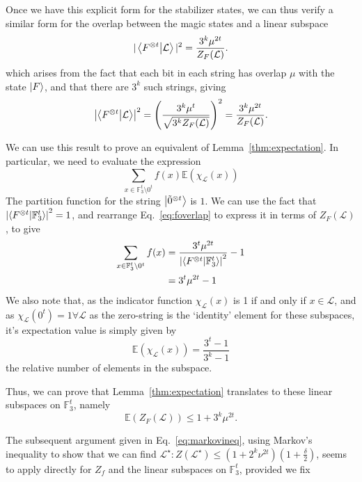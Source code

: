 \documentclass{standalone}
\begin{document}
Once we have this explicit form for the stabilizer states, we can thus verify a similar form for the overlap between the magic states and a linear subspace
\begin{equation}\label{eq:foverlap}
\vert\braket{F^{\otimes t}}{\mathcal{L}}\vert^{2}=\frac{3^{k}\mu^{2t}}{Z_{F}(\mathcal{L})}.
\end{equation}
which arises from the fact that each bit in each string has overlap $\mu$ with the state $\ket{F}$, and that there are $3^{k}$ such strings, giving 
\[\left|\braket{F^{\otimes t}}{\mathcal{L}}\right|^{2}=\left(\frac{3^{k}\mu^{t}}{\sqrt{3^{k}Z_{F}(\mathcal{L})}}\right)^{2}=\frac{3^{k}\mu^{2t}}{Z_{F}(\mathcal{L})}.\]
\par
We can use this result to prove an equivalent of Lemma~\ref{thm:expectation}. In particular, we need to evaluate the expression
\[\sum_{x\in\mathbb{F}_{3}^{t}\setminus 0^{t}}f(x)\mathbb{E}(\chi_{\mathcal{L}}(x))\] 
The partition function for the string $\ket{\tilde{0}^{\otimes t}}$ is $1$. We can use the fact that $\left|\braket{F^{\otimes t}}{\mathbb{F}_{3}^{t}}\right|^{2}=1$, and rearrange Eq.~\ref{eq:foverlap} to express it in terms of $Z_{F}(\mathcal{L})$, to give
\begin{align}
\begin{split}
\sum_{x\in\mathbb{F}_{3}^{t}\setminus 0^{t}}f(x) &= 
\frac{3^{t}\mu^{2t}}{\left|\braket{F^{\otimes t}}{\mathbb{F}_{3}^{t}}\right|^{2}} - 1\\
&= 3^{t}\mu^{2t}-1
\end{split}
\end{align}
We also note that, as the indicator function $\chi_{\mathcal{L}}(x)$ is 1 if and only if $x\in\mathcal{L}$, and as $\chi_{\mathcal{L}}(0^{t})=1\forall\mathcal{L}$ as the zero-string is the `identity' element for these subspaces, it's expectation value is simply given by
\begin{equation}
\mathbb{E}\left(\chi_{\mathcal{L}}(x)\right)=\frac{3^{t}-1}{3^{k}-1}
\end{equation}
the relative number of elements in the subspace. 
\par
Thus, we can prove that Lemma~\ref{thm:expectation} translates to these linear subspaces on $\mathbb{F}_{3}^{t}$, namely
\begin{equation}
\mathbb{E}\left( Z_{F}(\mathcal{L}) \right)\leq 1+3^{k}\mu^{2t}.
\end{equation}
\par
The subsequent argument given in Eq.~\ref{eq:markovineq}, using Markov's inequality to show that we can find $\mathcal{L}^{\star}:Z\left(\mathcal{L}^{\star}\right)\leq(1+2^{k}\nu^{2t})\left(1+\frac{\delta}{2}\right)$, seems to apply directly for $Z_{f}$ and the linear subspaces on $\mathbb{F}_{3}^{t}$, provided we fix
\end{document}

